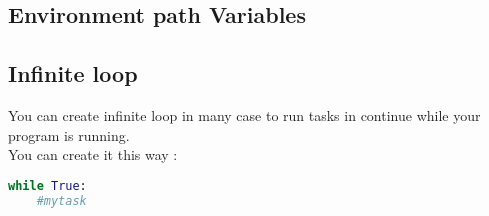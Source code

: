 \documentclass[a4paper, 12pt, titlepage]{scrartcl} %
\begin{document}
\subsection{Environment path Variables}
\label{subsec:PathVariables}

\subsection{Infinite loop}
\label{subsec:While}
You can create infinite loop in many case to run tasks in continue while your program is running. \\
You can create it this way :
\begin{lstlisting}[language=Python]
while True:
    #mytask
\end{lstlisting} \vspace{5mm}
\end{document}

